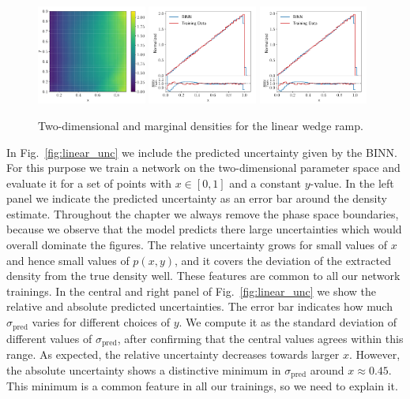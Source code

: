 \begin{figure}[b!]
\centering
\includegraphics[width=0.32\textwidth, page=1]{./figures/bINN/linear_2dhists}
\includegraphics[width=0.32\textwidth, page=1]{./figures/bINN/linear_1dhists}
\includegraphics[width=0.32\textwidth, page=2]{./figures/bINN/linear_1dhists}
\caption{Two-dimensional and marginal densities for the linear wedge
  ramp.}
\label{fig:linear_ring_hists}
\end{figure}

In Fig.~\ref{fig:linear_unc} we include the predicted uncertainty
given by the BINN. For this purpose we train a network on the
two-dimensional parameter space and evaluate it for a set of points
with $x \in [0,1]$ and a constant $y$-value. In the left panel we
indicate the predicted uncertainty as an error bar around the density
estimate. Throughout the chapter we always remove the phase space
boundaries, because we observe that the model predicts there large 
uncertainties which would overall dominate the figures. The relative
uncertainty grows for small values of $x$ and hence small values of
$p(x,y)$, and it covers the deviation of the extracted density from
the true density well. These features are common to all our network
trainings. In the central and right panel of Fig.~\ref{fig:linear_unc}
we show the relative and absolute predicted uncertainties. The error
bar indicates how much $\sigma_\text{pred}$ varies for different
choices of $y$. We compute it as the standard deviation of different
values of $\sigma_\text{pred}$, after confirming that the central
values agrees within this range. As expected, the relative uncertainty
decreases towards larger $x$. However, the absolute uncertainty shows
a distinctive minimum in $\sigma_\text{pred}$ around $x \approx
0.45$. This minimum is a common feature in all our trainings, so we
need to explain it.

